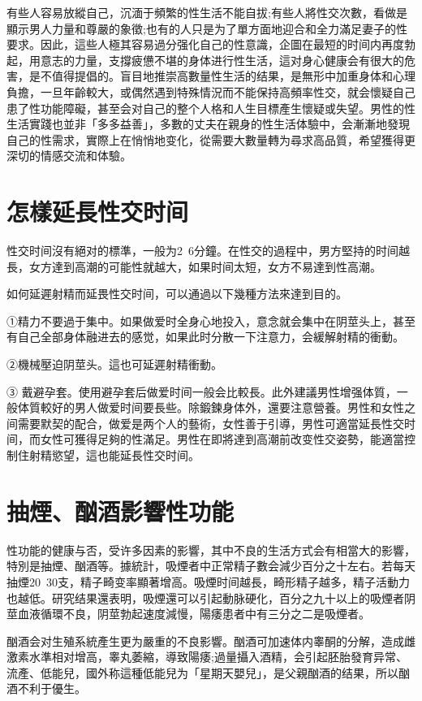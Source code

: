 \documentclass[12pt,UTF8]{ctexbook}
\begin{document}
有些人容易放縱自己，沉湎于頻繁的性生活不能自拔;有些人將性交次數，看做是顯示男人力量和尊嚴的象徵;也有的人只是为了單方面地迎合和全力滿足妻子的性要求。因此，這些人極其容易過分强化自己的性意識，企圖在最短的时间内再度勃起，用意志的力量，支撐疲憊不堪的身体进行性生活，這对身心健康会有很大的危害，是不值得提倡的。盲目地推崇高數量性生活的结果，是無形中加重身体和心理負擔，一旦年齡較大，或偶然遇到特殊情況而不能保持高頻率性交，就会懷疑自己患了性功能障礙，甚至会对自己的整个人格和人生目標產生懷疑或失望。男性的性生活實踐也並非「多多益善」，多數的丈夫在親身的性生活体驗中，会漸漸地發現自己的性需求，實際上在悄悄地变化，從需要大數量轉为尋求高品質，希望獲得更深切的情感交流和体驗。

\section{怎樣延長性交时间}

性交时间沒有絕对的標準，一般为2~6分鐘。在性交的過程中，男方堅持的时间越長，女方達到高潮的可能性就越大，如果时间太短，女方不易達到性高潮。

如何延遲射精而延畏性交时间，可以通過以下幾種方法來達到目的。

①精力不要過于集中。如果做爱时全身心地投入，意念就会集中在阴莖头上，甚至有自己全部身体融进去的感觉，如果此时分散一下注意力，会緩解射精的衝動。

②機械壓迫阴莖头。這也可延遲射精衝動。

③ 戴避孕套。使用避孕套后做爱时间一般会比較長。此外建議男性增强体質，一般体質較好的男人做爱时间要長些。除鍛鍊身体外，還要注意營養。男性和女性之间需要默契的配合，做爱是两个人的藝術，女性善于引導，男性可適當延長性交时间，而女性可獲得足夠的性滿足。男性在即將達到高潮前改变性交姿勢，能適當控制住射精慾望，這也能延長性交时间。

\section{抽煙、酗酒影響性功能}

性功能的健康与否，受许多因素的影響，其中不良的生活方式会有相當大的影響，特別是抽煙、酗酒等。據統計，吸煙者中正常精子數会減少百分之十左右。若每天抽煙20~30支，精子畸变率顯著增高。吸煙时间越長，畸形精子越多，精子活動力也越低。研究结果還表明，吸煙還可以引起動脉硬化，百分之九十以上的吸煙者阴莖血液循環不良，阴莖勃起速度減慢，陽痿患者中有三分之二是吸煙者。

酗酒会对生殖系統產生更为嚴重的不良影響。酗酒可加速体内睾酮的分解，造成雌激素水準相对增高，睾丸萎縮，導致陽痿;過量攝入酒精，会引起胚胎發育异常、流產、低能兒，國外称這種低能兒为「星期天嬰兒」，是父親酗酒的结果，所以酗酒不利于優生。
\end{document}

